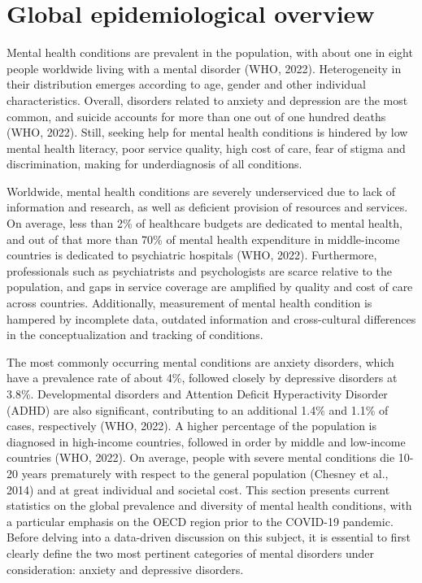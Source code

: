 \section{Global epidemiological overview}
    Mental health conditions are prevalent in the population, with about one in eight people worldwide living with a mental disorder (WHO, 2022). Heterogeneity in their distribution emerges according to age, gender and other individual characteristics. Overall, disorders related to anxiety and depression are the most common, and suicide accounts for more than one out of one hundred deaths (WHO, 2022). 
    Still, seeking help for mental health conditions is hindered by low mental health literacy, poor service quality, high cost of care, fear of stigma and discrimination, making for underdiagnosis of all conditions. 

    Worldwide, mental health conditions are severely underserviced due to lack of information and research, as well as deficient provision of resources and services. On average, less than 2\% of healthcare budgets are dedicated to mental health, and out of that more than 70\% of mental health expenditure in middle-income countries is dedicated to psychiatric hospitals (WHO, 2022). 
    Furthermore, professionals such as psychiatrists and psychologists are scarce relative to the population, and gaps in service coverage are amplified by quality and cost of care across countries. 
    Additionally, measurement of mental health condition is hampered by incomplete data, outdated information and cross-cultural differences in the conceptualization and tracking of conditions.

    The most commonly occurring mental conditions are anxiety disorders, which have a prevalence rate of about 4\%, followed closely by depressive disorders at 3.8\%. Developmental disorders and Attention Deficit Hyperactivity Disorder (ADHD) are also significant, contributing to an additional 1.4\% and 1.1\% of cases, respectively (WHO, 2022).
    A higher percentage of the population is diagnosed in high-income countries, followed in order by middle and low-income countries (WHO, 2022). On average, people with severe mental conditions die 10-20 years prematurely with respect to the general population (Chesney et al., 2014) and at great individual and societal cost. 
    This section presents current statistics on the global prevalence and diversity of mental health conditions, with a particular emphasis on the OECD region prior to the COVID-19 pandemic. Before delving into a data-driven discussion on this subject, it is essential to first clearly define the two most pertinent categories of mental disorders under consideration: anxiety and depressive disorders. 


